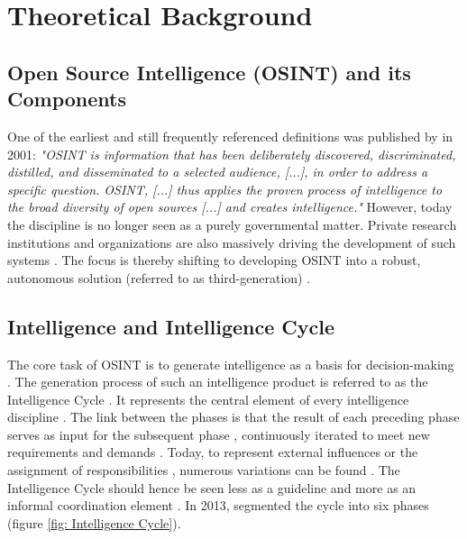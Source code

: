 \documentclass[10pt]{article}
\begin{document}
\section{Theoretical Background} \label{sec:theoreticalbackground}


\subsection{Open Source Intelligence (OSINT) and its Components}

One of the earliest and still frequently referenced definitions \cite{DosPassos.2017}
was published by \cite{NorthAtlanticTreatyOrganization.2001} in 2001: \textit{"OSINT is information that has been
    deliberately discovered, discriminated, distilled, and disseminated to a selected audience,
    [...], in order to address a specific question. OSINT, [...] thus applies the proven
    process of intelligence to the broad diversity of open sources [...] and creates
    intelligence."} However, today the discipline is no longer seen as a purely governmental
matter. Private research institutions and organizations \cite{Bohm.2021,Mercado.2005} are
also massively driving the development of such systems
\cite{Dokman.2020, Ghioni.2023}. The focus is thereby shifting to
developing OSINT into a robust, autonomous solution (referred to as third-generation) \cite{PastorGalindo.2019}.

\subsection{Intelligence and Intelligence Cycle}

The core task of OSINT is to generate intelligence as a basis for decision-making
\cite{Breakspear.2013,NorthAtlanticTreatyOrganization.2001}. The generation process of such an intelligence product
is referred to as the Intelligence Cycle \cite{CentralIntelligenceAgency.1987}.
It represents the central element of every intelligence discipline \cite{Reuser.2017}.
The link between the phases is that the result of each preceding phase serves as input for the subsequent phase \cite{JointChiefsofStaffU.S.Army.2013}, continuously iterated to meet new requirements and demands \cite{Gibson.2016}.
Today, to represent external influences or the assignment of responsibilities \cite{Lowenthal.2020,Phythian.2013}, numerous
variations can be found \cite{Reuser.2017}. The Intelligence Cycle should hence be seen less as a guideline and more as an informal
coordination element \cite{Hwang.2022}. In 2013, \cite{JointChiefsofStaffU.S.Army.2013} segmented the cycle into six phases  (figure \ref{fig: Intelligence Cycle}).
\end{document}
